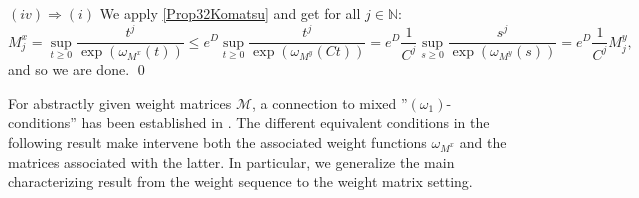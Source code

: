 \documentclass[10pt]{amsart}%
\numberwithin{equation}{section}
\theoremstyle{plain}
\newcommand{\NN}{\mathbb{N}}
\begin{document}
$(iv)\Rightarrow(i)$ We apply \eqref{Prop32Komatsu} and get for all $j\in\NN$:
$$M^x_j=\sup_{t\ge 0}\frac{t^j}{\exp(\omega_{M^x}(t))}\le e^D\sup_{t\ge 0}\frac{t^j}{\exp(\omega_{M^y}(Ct))}=e^D\frac{1}{C^j}\sup_{s\ge 0}\frac{s^j}{\exp(\omega_{M^y}(s))}=e^D\frac{1}{C^j}M^y_j,$$
and so we are done.
\qed\enddemo

For abstractly given weight matrices $\mathcal{M}$, a connection to mixed ''\hyperlink{om1}{$(\omega_1)$}-conditions'' has been established in \cite[Prop. 3.12, Cor. 3.15]{testfunctioncharacterization}. The different equivalent conditions in the following result make intervene both the associated weight functions $\omega_{M^x}$ and the matrices associated with the latter. In particular, we generalize the main characterizing result \cite[Thm. 3.1]{subaddlike} from the weight sequence to the weight matrix setting.
\end{document}
